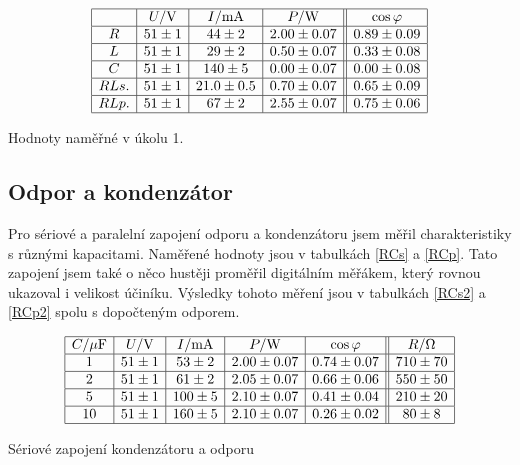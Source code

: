 \documentclass[a4paper,12pt]{article}
\begin{document}
\begin{table}
$$
\begin{array}{|c|c|c|c||c|}
\hline
&   U/\mbox{V}& I/\mbox{mA}&    P/\mbox{W}& \cos\varphi \\ \hline
R&  51 \pm 1&   44\pm 2&    2.00\pm 0.07&   0.89 \pm 0.09 \\ \hline
L&  51 \pm 1&   29\pm 2&    0.50\pm 0.07&   0.33 \pm 0.08  \\ \hline
C&  51 \pm 1&   140\pm 5&   0.00\pm 0.07&   0.00 \pm 0.08 \\ \hline
RL s.&  51\pm1& 21.0\pm 0.5&    0.70 \pm 0.07&  0.65\pm 0.09\\ \hline
RL p.&  51\pm1& 67\pm2&     2.55 \pm 0.07&  0.75\pm 0.06\\ \hline
\end{array}
$$
\caption{Hodnoty naměřné v úkolu 1.}
\label{TUk1}
\end{table}

\subsection{Odpor a kondenzátor}
Pro sériové a paralelní zapojení odporu a kondenzátoru jsem měřil charakteristiky s různými kapacitami. Naměřené hodnoty jsou v tabulkách \ref{RCs} a \ref{RCp}. 
Tato zapojení jsem také o něco hustěji proměřil digitálním měřákem, který rovnou ukazoval i velikost účiníku. Výsledky tohoto měření jsou v tabulkách \ref{RCs2} a \ref{RCp2} spolu 
s dopočteným odporem.

\begin{table}
$$
\begin{array}{|c|c|c|c|c||c|}
\hline
C/\mu\mbox{F}&  U/\mbox{V}& I/\mbox{mA}&    P/\mbox{W}& \cos\varphi&    R/\Omega \\ \hline
1&  51\pm1& 53\pm2& 2.00\pm0.07&    0.74\pm0.07&    710\pm 70 \\ \hline
2&  51\pm1& 61\pm2& 2.05\pm 0.07&   0.66\pm0.06&    550\pm 50 \\ \hline
5&  51\pm1& 100\pm5&    2.10\pm 0.07&   0.41\pm0.04&    210\pm 20 \\ \hline
10& 51\pm1& 160\pm5&    2.10\pm 0.07&   0.26\pm0.02&    80\pm 8 \\ \hline
\end{array}
$$
\caption{Sériové zapojení kondenzátoru a odporu}
\label{RCs}
\end{table}
\end{document}
